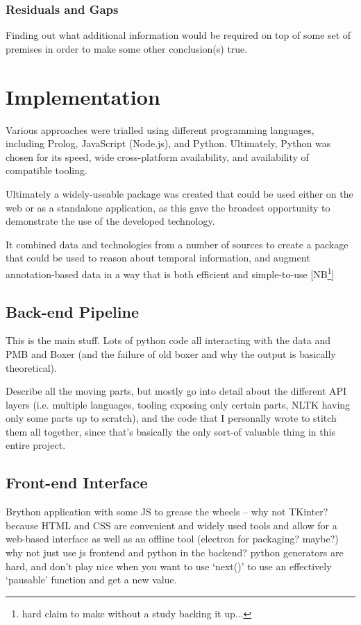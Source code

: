 \documentclass[a4paper,12pt,leqno]{article}
\newcommand{\selfnote}[1]{{\color{red}[NB\footnote{{\color{red}#1}}]}}
\newcommand{\nb}{\selfnote}
\begin{document}
\subsubsection{Residuals and Gaps}\label{ssub:residuals}
Finding out what additional information would be required on top of some set of premises in order to make some other conclusion(s) true.

\newpage
\section{Implementation}\label{sec:implementation}
Various approaches were trialled using different programming languages, including Prolog, JavaScript (Node.js), and Python. Ultimately, Python was chosen for its speed, wide cross-platform availability, and availability of compatible tooling.

Ultimately a widely-useable package was created that could be used either on the web or as a standalone application, as this gave the broadest opportunity to demonstrate the use of the developed technology.

It combined data and technologies from a number of sources to create a package that could be used to reason about temporal information, and augment annotation-based data in a way that is both efficient and simple-to-use \nb{hard claim to make without a study backing it up...}

\subsection{Back-end Pipeline}\label{sub:backend} %
This is the main stuff. Lots of python code all interacting with the data and PMB and Boxer (and the failure of old boxer and why the output is basically theoretical).

Describe all the moving parts, but mostly go into detail about the different API layers (i.e. multiple languages, tooling exposing only certain parts, NLTK having only some parts up to scratch), and the code that I personally wrote to stitch them all together, since that's basically the only sort-of valuable thing in this entire project.

\subsection{Front-end Interface}\label{sub:frontend}
Brython application with some JS to grease the wheels -- why not TKinter? because HTML and CSS are convenient and widely used tools and allow for a web-based interface as well as an offline tool (electron for packaging? maybe?) why not just use js frontend and python in the backend? python generators are hard, and don't play nice when you want to use `next()' to use an effectively `pausable' function and get a new value.
\end{document}
